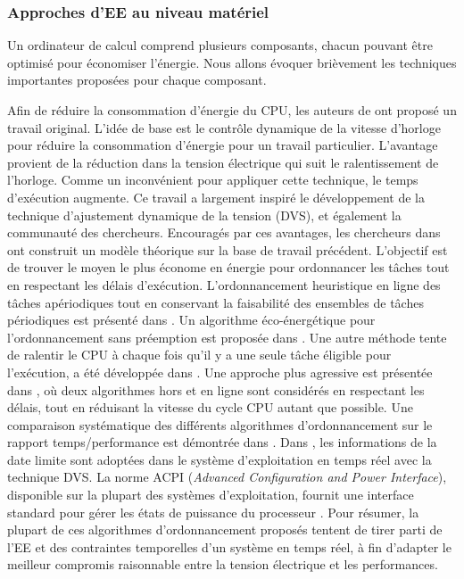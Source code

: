 \subsubsection{Approches d'EE au niveau matériel}
Un ordinateur de calcul comprend plusieurs composants, chacun pouvant être optimisé pour économiser l'énergie. Nous allons évoquer brièvement les techniques importantes proposées pour chaque composant.

Afin de réduire la consommation d'énergie du CPU, les auteurs de \cite{Weiser94} ont proposé un travail original. L'idée de base est le contrôle dynamique de la vitesse d'horloge pour réduire la consommation d'énergie pour un travail particulier. L'avantage provient de la réduction dans la tension électrique qui suit le ralentissement de l'horloge. Comme un inconvénient pour appliquer cette technique, le temps d'exécution augmente. Ce travail a largement inspiré le développement de la technique d'ajustement dynamique de la tension (DVS), et également la communauté des chercheurs. Encouragés par ces avantages, les chercheurs dans \cite{Yao95} ont construit un modèle théorique sur la base de travail précédent. L'objectif est de trouver le moyen le plus économe en énergie pour ordonnancer les tâches tout en respectant les délais d'exécution. L'ordonnancement heuristique en ligne des tâches apériodiques tout en conservant la faisabilité des ensembles de tâches périodiques est présenté dans \cite{Hong98}. Un algorithme éco-énergétique pour l'ordonnancement sans préemption est proposée dans \cite{Hong99}. Une autre méthode tente de ralentir le CPU à chaque fois qu'il y a une seule tâche éligible pour l'exécution, a été développée dans \cite{Shin99}. Une approche plus agressive est présentée dans \cite{Aydin01}, où deux algorithmes hors et en ligne sont considérés en respectant les délais, tout en réduisant la vitesse du cycle CPU autant que possible. Une comparaison systématique des différents algorithmes d'ordonnancement sur le rapport temps/performance est démontrée dans \cite{Govil95}. Dans \cite{Pillai01}, les informations de la date limite sont adoptées dans le système d'exploitation en temps réel avec la technique DVS. La norme ACPI  (\textit{Advanced Configuration and Power Interface}), disponible sur la plupart des systèmes d'exploitation, fournit une interface standard pour gérer les états de puissance du processeur \cite{Bergamaschi12}. Pour résumer, la plupart de ces algorithmes d'ordonnancement proposés tentent de tirer parti de l'EE et des contraintes temporelles d'un système en temps réel, à fin d'adapter le meilleur compromis raisonnable entre la tension électrique et les performances.

